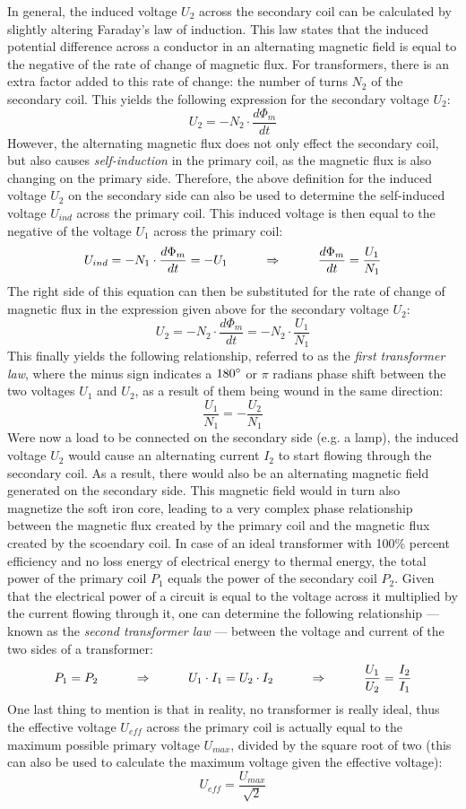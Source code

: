 In general, the induced voltage $U_2$ across the secondary coil can be calculated by slightly altering Faraday's law of induction. This law states that the induced potential difference across a conductor in an alternating magnetic field is equal to the negative of the rate of change of magnetic flux. For transformers, there is an extra factor added to this rate of change: the number of turns $N_2$ of the secondary coil. This yields the following expression for the secondary voltage $U_2$: $$U_2 = -N_2 \cdot \frac{d \Phi_m}{d t}$$ However, the alternating magnetic flux does not only effect the secondary coil, but also causes \emph{self-induction} in the primary coil, as the magnetic flux is also changing on the primary side. Therefore, the above definition for the induced voltage $U_2$ on the secondary side can also be used to determine the self-induced voltage $U_{ind}$ across the primary coil. This induced voltage is then equal to the negative of the voltage $U_1$ across the primary coil: $$U_{ind} = -N_1 \cdot \frac{d \Phi_m}{d t} = -U_1 \hspace{1 cm} \Rightarrow \hspace{1 cm} \frac{d \Phi_m}{d t} = \frac{U_1}{N_1}$$ The right side of this equation can then be substituted for the rate of change of magnetic flux in the expression given above for the secondary voltage $U_2$: $$U_2 = -N_2 \cdot \frac{d \Phi_m}{dt} = -N_2 \cdot \frac{U_1}{N_1}$$ This finally yields the following relationship, referred to as the \emph{first transformer law}, where the minus sign indicates a $180\degree$ or $\pi$ radians phase shift between the two voltages $U_1$ and $U_2$, as a result of them being wound in the same direction: $$\frac{U_1}{N_1} = -\frac{U_2}{N_1}$$ Were now a load to be connected on the secondary side (e.g. a lamp), the induced voltage $U_2$ would cause an alternating current $I_2$ to start flowing through the secondary coil. As a result, there would also be an alternating magnetic field generated on the secondary side. This magnetic field would in turn also magnetize the soft iron core, leading to a very complex phase relationship between the magnetic flux created by the primary coil and the magnetic flux created by the scoendary coil. In case of an ideal transformer with 100\% percent efficiency and no loss energy of electrical energy to thermal energy, the total power of the primary coil $P_1$ equals the power of the secondary coil $P_2$. Given that the electrical power of a circuit is equal to the voltage across it multiplied by the current flowing through it, one can determine the following relationship --- known as the \emph{second transformer law} --- between the voltage and current of the two sides of a transformer: $$P_1 = P_2 \hspace{1 cm} \Rightarrow \hspace{1 cm} U_1 \cdot I_1 = U_2 \cdot I_2 \hspace{1 cm} \Rightarrow \hspace{1 cm} \frac{U_1}{U_2} = \frac{I_2}{I_1}$$ One last thing to mention is that in reality, no transformer is really ideal, thus the effective voltage $U_{eff}$ across the primary coil is actually equal to the maximum possible primary voltage $U_{max}$, divided by the square root of two (this can also be used to calculate the maximum voltage given the effective voltage): $$U_{eff} = \frac{U_{max}}{\sqrt{2}}$$

